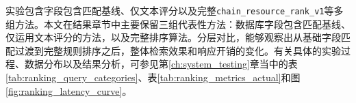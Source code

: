 实验包含字段包含匹配基线、仅文本评分以及完整\texttt{chain\_resource\_rank\_v1}等多组方法。本文在结果章节中主要保留三组代表性方法：数据库字段包含匹配基线、仅运用文本评分的方法，以及完整排序算法。分层对比，能够观察出从基础字段匹配过渡到完整规则排序之后，整体检索效果和响应开销的变化。有关具体的实验过程、数据分布以及结果分析，可参见第\ref{ch:system_testing}章当中的表\ref{tab:ranking_query_categories}、表\ref{tab:ranking_metrics_actual}和图\ref{fig:ranking_latency_curve}。

